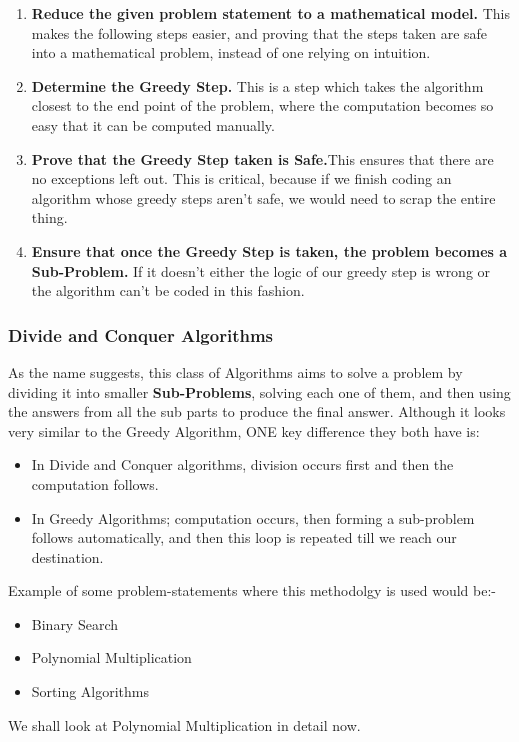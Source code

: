 \documentclass{article}
\theoremstyle{definition}
\theoremstyle{example}
\begin{document}
\begin{enumerate}
    \item \textbf{Reduce the given problem statement to a mathematical model.} This makes the following steps easier, and proving that the steps taken are safe into a mathematical problem, instead of one relying on intuition.
    \item \textbf{Determine the Greedy Step.} This is a step which takes the algorithm closest to the end point of the problem, where the computation becomes so easy that it can be computed manually.
    \item \textbf{Prove that the Greedy Step taken is Safe.}This ensures that there are no exceptions left out. This is critical, because if we finish coding an algorithm whose greedy steps aren't safe, we would need to scrap the entire thing.
    \item \textbf{Ensure that once the Greedy Step is taken, the problem becomes a Sub-Problem.} If it doesn't either the logic of our greedy step is wrong or the algorithm can't be coded in this fashion.
\end{enumerate}

\subsubsection{\Large Divide and Conquer Algorithms}
\hspace{5mm}As the name suggests, this class of Algorithms aims to solve a problem by dividing it into smaller \textbf{Sub-Problems}, solving each one of them, and then using the answers from all the sub parts to produce the final answer. Although it looks very similar to the Greedy Algorithm, ONE key difference they both have is:
\begin{itemize}
    \item In Divide and Conquer algorithms, division occurs first and then the computation follows.
    \item In Greedy Algorithms; computation occurs, then forming a sub-problem follows automatically, and then this loop is repeated till we reach our destination. 
\end{itemize}
Example of some problem-statements where this methodolgy is used would be:-
\begin{itemize}
    \item Binary Search
    \item Polynomial Multiplication
    \item Sorting Algorithms
\end{itemize}
We shall look at Polynomial Multiplication in detail now.\par
\end{document}
